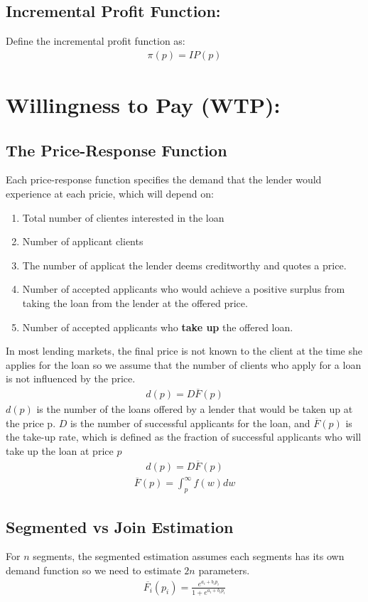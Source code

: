 \documentclass[12pt]{book}
\begin{document}
\subsection{ Incremental Profit Function: }
Define the incremental profit function as:
\begin{align}
\pi(p)=IP(p)
\end{align}

\section{Willingness to Pay (WTP): }
\subsection{The Price-Response Function}
Each price-response function specifies the demand that the lender would experience at each pricie, which will depend on:
\begin{enumerate}
    \item Total number of clientes interested in the loan
    \item Number of applicant clients
    \item The number of applicat the lender deems creditworthy and quotes a price.
    \item Number of accepted applicants who would achieve a positive surplus from taking the loan from the lender at the offered price.
    \item Number of accepted applicants who \textbf{ take up} the offered loan.
\end{enumerate}
In most lending markets, the final price is not known to the client at the time she applies for the loan so we assume that the number of clients who apply for a loan is not influenced by the price.
\begin{align}
d(p)=D\overline{F}(p)
\end{align}
$d(p)$ is the number of the loans offered by a lender that would be taken up at the price p. $D$ is the number of successful applicants for the loan, and $\overline{F}(p)$ is the take-up rate, which is defined as the fraction of successful applicants who will take up the loan at price $p$
\begin{align}
d(p)=D\overline{F}(p)
\end{align}
\begin{align}
\overline{F}(p)=\int^\infty_p f(w)dw
\end{align}
\subsection{Segmented vs Join Estimation}
For $n$ segments, the segmented estimation assumes each segments has its own demand function so we need to estimate $2n$ parameters.
\begin{align}
\overline{F_i}(p_i)=\frac{e^{a_i+b_i p_i}}{1+e^{a_i+b_i p_i}}
\end{align}
\end{document}

